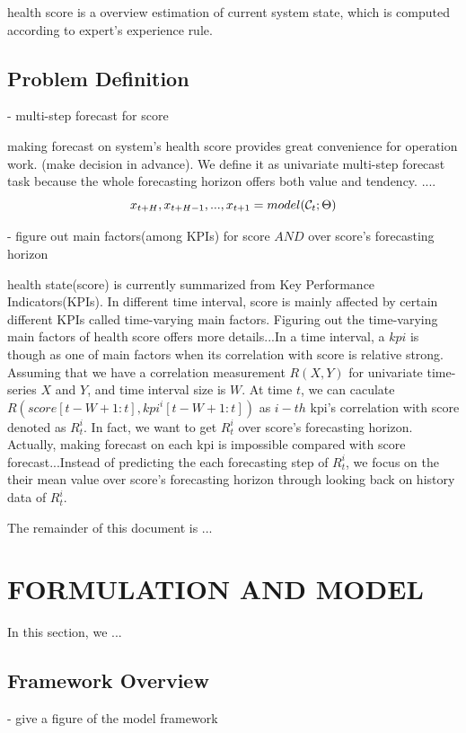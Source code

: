 \documentclass{sigkddExp}
\begin{document}
health score is a overview estimation of current system state, which is computed according to expert's experience rule.

\subsection{Problem Definition}
  - multi-step forecast for score

making forecast on system's health score provides great convenience for operation work. (make decision in advance). We define it as univariate multi-step forecast task because the whole forecasting horizon offers both value and tendency. ....\begin{equation} x_{t+H}, x_{t+H-1}, ..., x_{t+1} = model({\cal C}_t; \Theta)\end{equation}

  - figure out main factors(among KPIs) for score $AND$ over score's forecasting horizon

health state(score) is currently summarized from Key Performance Indicators(KPIs). In different time interval, score is mainly affected by certain different KPIs called time-varying main factors. Figuring out the time-varying main factors of health score offers more details...In a time interval, a $kpi$ is though as one of main factors when its correlation with score is relative strong. Assuming that we have a correlation measurement $R(X, Y)$ for univariate time-series $X$ and $Y$, and time interval size is $W$. At time $t$, we can caculate $R(score[t-W+1:t], kpi^{i}[t-W+1:t])$ as $i-th$ kpi's correlation with score denoted as $R^{i}_{t}$. In fact, we want to get $R^{i}_{t}$ over score's forecasting horizon. Actually, making forecast on each kpi is impossible compared with score forecast...Instead of predicting the each forecasting step of $R^{i}_{t}$, we focus on the their mean value over score's forecasting horizon through looking back on history data of $R^{i}_{t}$.





The remainder of this document is ...

\section{FORMULATION AND MODEL}
In this section, we ...

\subsection{Framework Overview}
  - give a figure of the model framework
\end{document}
